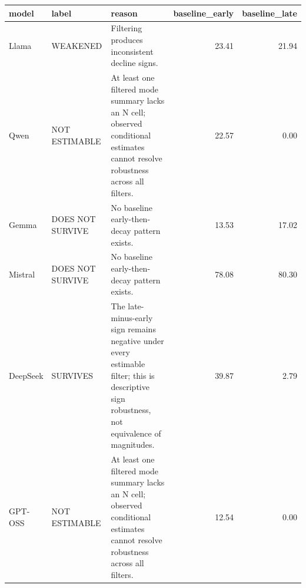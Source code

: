 \begin{tabular}{lllrr}
\toprule
model & label & reason & baseline\_early & baseline\_late \\
\midrule
Llama & WEAKENED & Filtering produces inconsistent decline signs. & 23.41 & 21.94 \\
Qwen & NOT ESTIMABLE & At least one filtered mode summary lacks an N cell; observed conditional estimates cannot resolve robustness across all filters. & 22.57 & 0.00 \\
Gemma & DOES NOT SURVIVE & No baseline early-then-decay pattern exists. & 13.53 & 17.02 \\
Mistral & DOES NOT SURVIVE & No baseline early-then-decay pattern exists. & 78.08 & 80.30 \\
DeepSeek & SURVIVES & The late-minus-early sign remains negative under every estimable filter; this is descriptive sign robustness, not equivalence of magnitudes. & 39.87 & 2.79 \\
GPT-OSS & NOT ESTIMABLE & At least one filtered mode summary lacks an N cell; observed conditional estimates cannot resolve robustness across all filters. & 12.54 & 0.00 \\
\bottomrule
\end{tabular}
